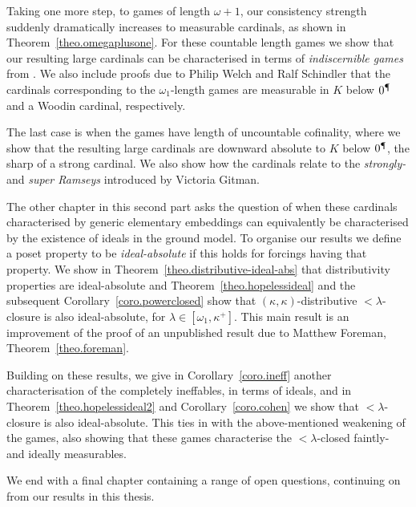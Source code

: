 \documentclass[../main]{subfiles}
\begin{document}
\begin{onehalfspacing}
\quad Taking one more step, to games of length $\omega+1$, our consistency strength suddenly dramatically increases to measurable cardinals, as shown in Theorem~\ref{theo.omegaplusone}. For these countable length games we show that our resulting large cardinals can be characterised in terms of \textit{indiscernible games} from \cite{SharpeWelch}. We also include proofs due to Philip Welch and Ralf Schindler that the cardinals corresponding to the $\omega_1$-length games are measurable in $K$ below $0^\mathparagraph$ and a Woodin cardinal, respectively.

\quad The last case is when the games have length of uncountable cofinality, where we show that the resulting large cardinals are downward absolute to $K$ below $0^\mathparagraph$, the sharp of a strong cardinal. We also show how the cardinals relate to the \textit{strongly-} and \textit{super Ramseys} introduced by Victoria Gitman.

\quad The other chapter in this second part asks the question of when these cardinals characterised by generic elementary embeddings can equivalently be characterised by the existence of ideals in the ground model. To organise our results we define a poset property to be \textit{ideal-absolute} if this holds for forcings having that property. We show in Theorem~\ref{theo.distributive-ideal-abs} that distributivity properties are ideal-absolute and Theorem~\ref{theo.hopelessideal} and the subsequent Corollary~\ref{coro.powerclosed} show that $(\kappa,\kappa)$-distributive ${<}\lambda$-closure is also ideal-absolute, for $\lambda\in[\omega_1,\kappa^+]$. This main result is an improvement of the proof of an unpublished result due to Matthew Foreman, Theorem~\ref{theo.foreman}. 

\quad Building on these results, we give in Corollary~\ref{coro.ineff} another characterisation of the completely ineffables, in terms of ideals, and in Theorem~\ref{theo.hopelessideal2} and Corollary~\ref{coro.cohen} we show that ${<}\lambda$-closure is also ideal-absolute. This ties in with the above-mentioned weakening of the games, also showing that these games characterise the ${<}\lambda$-closed faintly- and ideally measurables.

\quad We end with a final chapter containing a range of open questions, continuing on from our results in this thesis.

\end{onehalfspacing}
\setlength{\parindent}{0pt}
\end{document}
